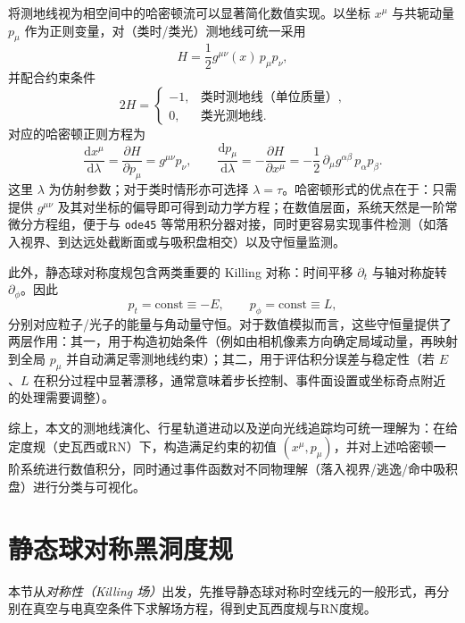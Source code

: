 \documentclass[a4paper,12pt]{article}
\begin{document}
将测地线视为相空间中的哈密顿流可以显著简化数值实现。以坐标 $x^\mu$ 与共轭动量 $p_\mu$ 作为正则变量，对（类时/类光）测地线可统一采用
\begin{equation}
H=\frac{1}{2}g^{\mu\nu}(x)\,p_\mu p_\nu,
\end{equation}
并配合约束条件
\begin{equation}
2H=
\begin{cases}
-1, & \text{类时测地线（单位质量）},\\
0,  & \text{类光测地线}.
\end{cases}
\end{equation}
对应的哈密顿正则方程为
\begin{equation}
\frac{\mathrm{d}x^\mu}{\mathrm{d}\lambda}=\frac{\partial H}{\partial p_\mu}=g^{\mu\nu}p_\nu,\qquad
\frac{\mathrm{d}p_\mu}{\mathrm{d}\lambda}=-\frac{\partial H}{\partial x^\mu}
=-\frac{1}{2}\,\partial_\mu g^{\alpha\beta}\,p_\alpha p_\beta.
\end{equation}
这里 $\lambda$ 为仿射参数；对于类时情形亦可选择 $\lambda=\tau$。哈密顿形式的优点在于：只需提供 $g^{\mu\nu}$ 及其对坐标的偏导即可得到动力学方程；在数值层面，系统天然是一阶常微分方程组，便于与 \texttt{ode45} 等常用积分器对接，同时更容易实现事件检测（如落入视界、到达远处截断面或与吸积盘相交）以及守恒量监测。

此外，静态球对称度规包含两类重要的 Killing 对称：时间平移 $\partial_t$ 与轴对称旋转 $\partial_\phi$。因此
\begin{equation}
p_t=\text{const}\equiv -E,\qquad p_\phi=\text{const}\equiv L,
\end{equation}
分别对应粒子/光子的能量与角动量守恒。对于数值模拟而言，这些守恒量提供了两层作用：其一，用于构造初始条件（例如由相机像素方向确定局域动量，再映射到全局 $p_\mu$ 并自动满足零测地线约束）；其二，用于评估积分误差与稳定性（若 $E$、$L$ 在积分过程中显著漂移，通常意味着步长控制、事件面设置或坐标奇点附近的处理需要调整）。

综上，本文的测地线演化、行星轨道进动以及逆向光线追踪均可统一理解为：在给定度规（史瓦西或RN）下，构造满足约束的初值 $(x^\mu,p_\mu)$，并对上述哈密顿一阶系统进行数值积分，同时通过事件函数对不同物理解（落入视界/逃逸/命中吸积盘）进行分类与可视化。

\section{静态球对称黑洞度规}

本节从\emph{对称性（Killing 场）}出发，先推导静态球对称时空线元的一般形式，再分别在真空与电真空条件下求解场方程，得到史瓦西度规与RN度规。
\end{document}
